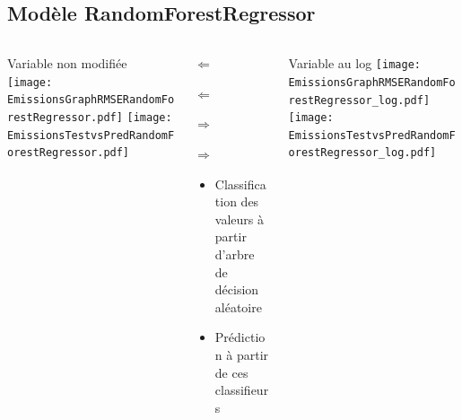 \documentclass[8pt,aspectratio=169,hyperref={unicode=true}]{beamer}
\begin{document}
\subsection{Modèle RandomForestRegressor}
\begin{frame}{\insertsubsection}
  \begin{columns}[t]
    \begin{column}{.33\textwidth}
      \centering Variable non modifiée
      \texttt{[image: EmissionsGraphRMSERandomForestRegressor.pdf]}
      \texttt{[image: EmissionsTestvsPredRandomForestRegressor.pdf]}
    \end{column}
    \begin{column}{.33\textwidth}
      $\Longleftarrow$
      \scriptsize
      {\centering
        }
      

      \normalsize
      $\Longleftarrow$

      \raggedleft $\Longrightarrow$
      \scriptsize
      {\centering
        }
      

      \normalsize
      $\Longrightarrow$
      \raggedright
      \begin{itemize}
        \item Classification des valeurs à partir d'arbre de décision aléatoire
        \item Prédiction à partir de ces classifieurs
      \end{itemize}
    \end{column}
    \begin{column}{.33\textwidth}
      \centering Variable au log
      \texttt{[image: EmissionsGraphRMSERandomForestRegressor\_log.pdf]}
      \texttt{[image: EmissionsTestvsPredRandomForestRegressor\_log.pdf]}
    \end{column}
  \end{columns}
\end{frame}
\end{document}

